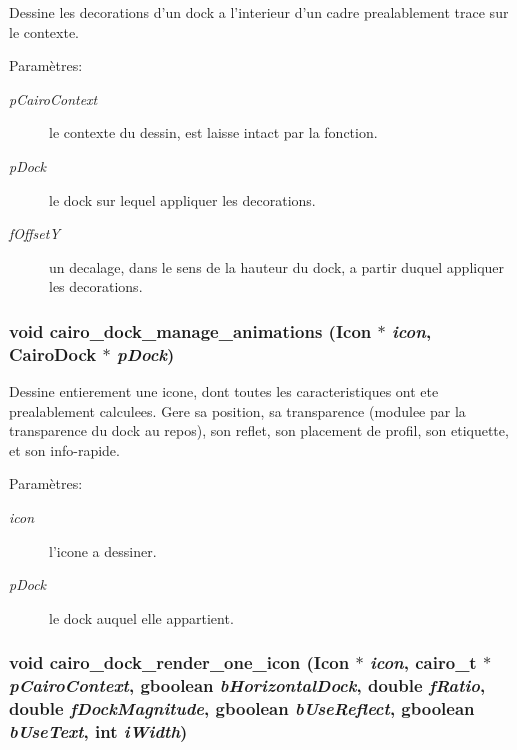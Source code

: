 Dessine les decorations d'un dock a l'interieur d'un cadre prealablement trace sur le contexte. \begin{Desc}
\item[Paramètres:]
\begin{description}
\item[{\em pCairoContext}]le contexte du dessin, est laisse intact par la fonction. \item[{\em pDock}]le dock sur lequel appliquer les decorations. \item[{\em fOffsetY}]un decalage, dans le sens de la hauteur du dock, a partir duquel appliquer les decorations. \end{description}
\end{Desc}
\subsubsection{\setlength{\rightskip}{0pt plus 5cm}void cairo\_\-dock\_\-manage\_\-animations ({\bf Icon} $\ast$ {\em icon}, {\bf CairoDock} $\ast$ {\em pDock})}\label{cairo-dock-draw_8h_c461010c8336cbe94f13a3d945eb3181}


Dessine entierement une icone, dont toutes les caracteristiques ont ete prealablement calculees. Gere sa position, sa transparence (modulee par la transparence du dock au repos), son reflet, son placement de profil, son etiquette, et son info-rapide. \begin{Desc}
\item[Paramètres:]
\begin{description}
\item[{\em icon}]l'icone a dessiner. \item[{\em pDock}]le dock auquel elle appartient. \end{description}
\end{Desc}
\subsubsection{\setlength{\rightskip}{0pt plus 5cm}void cairo\_\-dock\_\-render\_\-one\_\-icon ({\bf Icon} $\ast$ {\em icon}, cairo\_\-t $\ast$ {\em pCairoContext}, gboolean {\em bHorizontalDock}, double {\em fRatio}, double {\em fDockMagnitude}, gboolean {\em bUseReflect}, gboolean {\em bUseText}, int {\em iWidth})}\label{cairo-dock-draw_8h_415607545ab27ab8af88aa98a0a1eb7d}


